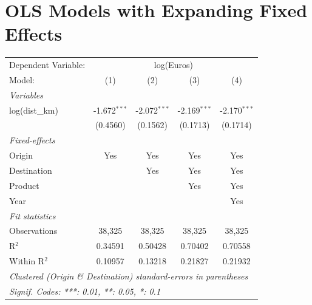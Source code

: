 \documentclass{article}
\begin{document}
\section*{OLS Models with Expanding Fixed Effects}

\begingroup
\centering
\begin{tabular}{lcccc}
   \tabularnewline \midrule \midrule
   Dependent Variable: & \multicolumn{4}{c}{log(Euros)}\\
   Model:         & (1)            & (2)            & (3)            & (4)\\  
   \midrule
   \emph{Variables}\\
   log(dist\_km)  & -1.672$^{***}$ & -2.072$^{***}$ & -2.169$^{***}$ & -2.170$^{***}$\\   
                  & (0.4560)       & (0.1562)       & (0.1713)       & (0.1714)\\   
   \midrule
   \emph{Fixed-effects}\\
   Origin         & Yes            & Yes            & Yes            & Yes\\  
   Destination    &                & Yes            & Yes            & Yes\\  
   Product        &                &                & Yes            & Yes\\  
   Year           &                &                &                & Yes\\  
   \midrule
   \emph{Fit statistics}\\
   Observations   & 38,325         & 38,325         & 38,325         & 38,325\\  
   R$^2$          & 0.34591        & 0.50428        & 0.70402        & 0.70558\\  
   Within R$^2$   & 0.10957        & 0.13218        & 0.21827        & 0.21932\\  
   \midrule \midrule
   \multicolumn{5}{l}{\emph{Clustered (Origin \& Destination) standard-errors in parentheses}}\\
   \multicolumn{5}{l}{\emph{Signif. Codes: ***: 0.01, **: 0.05, *: 0.1}}\\
\end{tabular}
\par\endgroup
\end{document}
